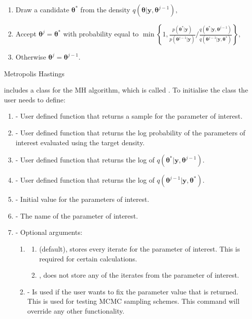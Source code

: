 \documentclass[article]{jss}
\begin{document}
%
\begin{algorithm}[H]
\begin{enumerate}
\item Draw a candidate $\bm{\bm{\theta}}^{\ast}$ from the density $q\left(\bm{\bm{\theta}}|\bm{y},\bm{\theta}^{j-1}\right),$ 
\item Accept $\bm{\theta}^{j}=\bm{\theta}^{\ast}$ with probability equal
to $\min\left\{ 1,\frac{p\left(\bm{\theta}^{\ast}|\bm{y}\right)}{p\left(\bm{\theta}^{j-1}|\bm{y}\right)}/\frac{q\left(\bm{\theta}^{\ast}|\bm{y},\bm{\theta}^{j-1}\right)}{q\left(\bm{\theta}^{j-1}|\bm{y},\bm{\theta}^{*}\right)}\right\} ,$ 
\item Otherwise $\bm{\theta}^{j}=\bm{\theta}^{j-1}.$ 
\end{enumerate}
\caption{Metropolis Hastings}
\label{alg:MH}
\end{algorithm}


 includes a class for the MH algorithm, which is called
.  To initialise the class the user needs to define:
\begin{enumerate}
\item {} - User defined function that returns a sample for
  the parameter of interest.
\item {} - User defined function that returns the log
  probability of the parameters of interest evaluated using the target
  density.
\item {} - User defined function that returns the log
  of $q\left(\bm{\theta}^{\ast}|\bm{y},\bm{\theta}^{j-1}\right).$
\item {} - User defined function that returns the log
  of $q\left(\bm{\theta}^{j-1}|\bm{y},\bm{\theta}^{*}\right).$
\item {} - Initial value for the parameters of
  interest.
\item {} - The name of the parameter of interest.
\item {} - Optional arguments:

\begin{enumerate}
\item {}
\begin{enumerate}  
\item {} (default), stores every iterate for the parameter
  of interest. This is required for certain calculations.
\item {}, does not store any of the iterates from the parameter of
  interest.
\end{enumerate}
\item {} - Is used if the user wants to fix the
  parameter value that is returned. This is used for testing MCMC
  sampling schemes.  This command will override any other
  functionality.
\end{enumerate}
\end{enumerate}
\end{document}
